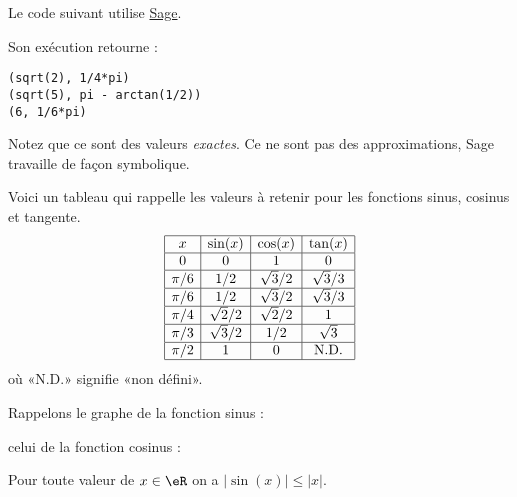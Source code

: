 Le code suivant utilise \href{http://www.sagemath.org}{Sage}.



Son exécution retourne :
\begin{verbatim}
(sqrt(2), 1/4*pi)
(sqrt(5), pi - arctan(1/2))
(6, 1/6*pi)
\end{verbatim}
Notez que ce sont des valeurs \emph{exactes}. Ce ne sont pas des approximations, Sage travaille de façon symbolique.

Voici un tableau qui rappelle les valeurs à retenir pour les fonctions sinus, cosinus et tangente.\label{PGooIMQFooTnBdIl}
\begin{equation*}
    \begin{array}[]{|c|c|c|c|}
      \hline
      x&\sin(x)&\cos(x)&\tan(x)\\
      \hline
      0&0&1&0\\
      \hline
      \pi/6&1/2&\sqrt{3}/2&\sqrt{3}/3\\
      \hline
      \pi/6&1/2&\sqrt{3}/2&\sqrt{3}/3\\
      \hline
      \pi/4&\sqrt{2}/2&\sqrt{2}/2&1\\
      \hline
      \pi/3&\sqrt{3}/2&1/2&\sqrt{3}\\
      \hline
      \pi/2&1&0&\text{N.D.}\\
      \hline
    \end{array}
\end{equation*}
où «N.D.»  signifie «non défini».

Rappelons le graphe de la fonction sinus :
\begin{center}
   
\end{center}
celui de la fonction cosinus :
\begin{center}
   
\end{center}


\begin{lemma}
  Pour toute valeur de $x\in \eR$ on a $|\sin(x)|\leq |x|$. 
\end{lemma}

